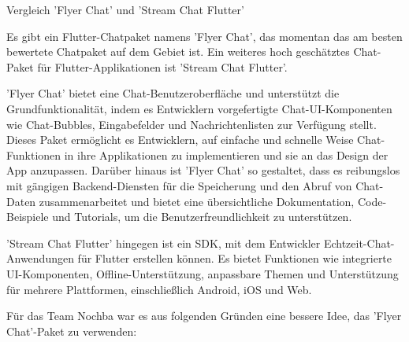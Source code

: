 Vergleich 'Flyer Chat' und 'Stream Chat Flutter'

Es gibt ein Flutter-Chatpaket namens 'Flyer Chat', das momentan das am besten bewertete Chatpaket auf dem Gebiet ist. Ein weiteres hoch geschätztes Chat-Paket für Flutter-Applikationen ist 'Stream Chat Flutter'.

'Flyer Chat' bietet eine Chat-Benutzeroberfläche und unterstützt die Grundfunktionalität, indem es Entwicklern vorgefertigte Chat-UI-Komponenten wie Chat-Bubbles, Eingabefelder und Nachrichtenlisten zur Verfügung stellt. Dieses Paket ermöglicht es Entwicklern, auf einfache und schnelle Weise Chat-Funktionen in ihre Applikationen zu implementieren und sie an das Design der App anzupassen. Darüber hinaus ist 'Flyer Chat' so gestaltet, dass es reibungslos mit gängigen Backend-Diensten für die Speicherung und den Abruf von Chat-Daten zusammenarbeitet und bietet eine übersichtliche Dokumentation, Code-Beispiele und Tutorials, um die Benutzerfreundlichkeit zu unterstützen.

'Stream Chat Flutter' hingegen ist ein SDK, mit dem Entwickler Echtzeit-Chat-Anwendungen für Flutter erstellen können. Es bietet Funktionen wie integrierte UI-Komponenten, Offline-Unterstützung, anpassbare Themen und Unterstützung für mehrere Plattformen, einschließlich Android, iOS und Web.

Für das Team Nochba war es aus folgenden Gründen eine bessere Idee, das 'Flyer Chat'-Paket zu verwenden:

